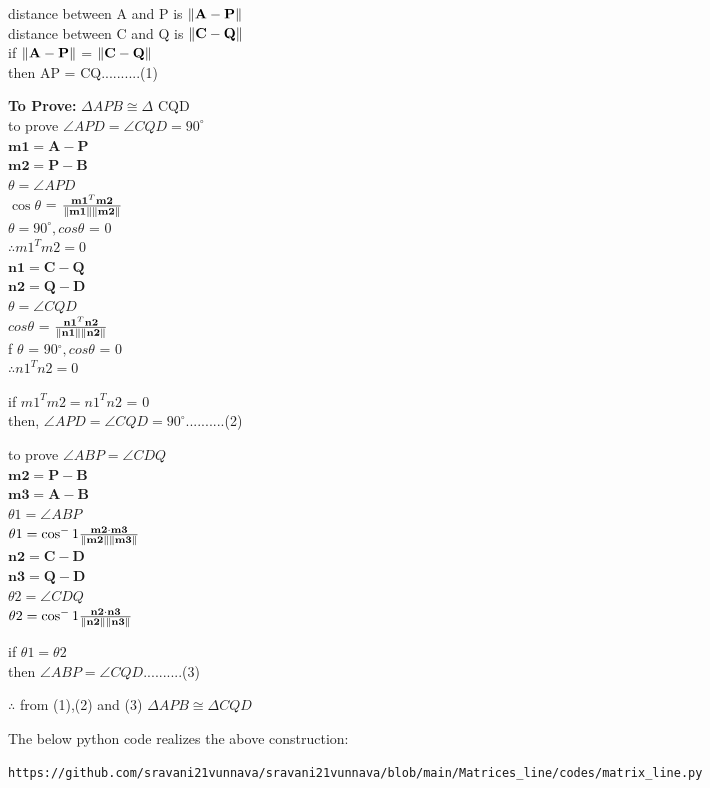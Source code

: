 \documentclass[10pt, a4paper]{article}
\let\vec\mathbf
\begin{document}
	distance between A and P is $\norm{\vec{A-P}}$\\
	distance between C and Q is $\norm{\vec{C-Q}}$\\
	if $\norm{\vec{A-P}}$ =  $\norm{\vec{C-Q}}$\\
	then AP = CQ..........(1)
	
	\textbf{To Prove:}  $\Delta APB \cong \Delta$ CQD\\
	to prove $\angle {APD}=\angle {CQD}=90^{\circ}$\\
	$\vec{m1} = \vec{A-P}$\\
	$\vec{m2} = \vec{P-B}$\\
	$\theta= \angle {APD}$ \\
	 $\cos\theta$ = $\frac{\vec{m1}^T \vec{m2}}{\norm{\vec{m1}}\norm{\vec{m2}}}$\\
	$\theta = 90^{\circ}, cos\theta$ = 0\\
	$\therefore m1^T m2 = 0$\\
	$\vec{n1} = \vec{C-Q}$\\
	$\vec{n2} = \vec{Q-D}$\\
	$\theta = \angle{CQD}$\\
	$cos\theta$ = $\frac{\vec{n1}^T \vec{n2}}{\norm{\vec{n1}}\norm{\vec{n2}}}$\\
	f $\theta$ = 90$^{\circ}, cos\theta$ = 0\\
	$\therefore n1^T n2 = 0$\\
	\begin{center}
	if 	$m1^T m2 = n1^T n2$ = 0\\
	then, $\angle {APD} = \angle {CQD} = 90^{\circ}$..........(2)\\
	\end{center}
	to prove $\angle {ABP}=\angle {CDQ}$ \\
	$\vec{m2} = \vec{P-B}$\\
	$\vec{m3} = \vec{A-B}$\\
	$\theta1 = \angle {ABP}$\\
	$\theta1 = \cos^-1\frac{\vec{m2} \cdot \vec{m3}}{\norm{\vec{m2}}\norm{\vec{m3}}}$\\
	$\vec{n2} = \vec{C-D}$\\
	$\vec{n3} = \vec{Q-D}$\\
	$\theta2 = \angle {CDQ}$\\
	$\theta2 = \cos^-1\frac{\vec{n2} \cdot \vec{n3}}{\norm{\vec{n2}}\norm{\vec{n3}}}$\\
	\begin{center}
	 		if $\theta1 = \theta2$\\
	 		then $\angle {ABP} = \angle {CQD}$..........(3)
	\end{center}
	\begin{center}
$\therefore$ from (1),(2) and (3)
$\Delta APB \cong \Delta CQD$ 
	\end{center}
The below python code realizes the above construction:	\\
\begin{lstlisting}
https://github.com/sravani21vunnava/sravani21vunnava/blob/main/Matrices_line/codes/matrix_line.py
\end{lstlisting}
 
\end{document}

